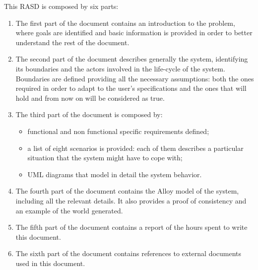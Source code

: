 This RASD is composed by six parts:
\begin{enumerate}
\item The first part of the document contains an introduction to the problem, where goals are identified and basic information is provided in order to better understand the rest of the document.
\item The second part of the document describes generally the system, identifying its boundaries and the actors involved in the life-cycle of the system. Boundaries are defined providing all the necessary assumptions: both the ones required in order to adapt to the user's specifications and the ones that will hold and from now on will be considered as true.
\item The third part of the document is composed by:
	\begin{itemize}
	\item functional and non functional specific requirements defined;
	\item a list of eight scenarios is provided: each of them describes a particular situation that the system might have to cope with;
	\item UML diagrams that model in detail the system behavior.
	\end{itemize}
\item The fourth part of the document contains the Alloy model of the system, including all the relevant 
details. It also provides a proof of consistency and an example of the world generated.
\item The fifth part of the document contains a report of the hours spent to write this document.
\item The sixth part of the document contains references to external documents used in this document.
\end{enumerate}
